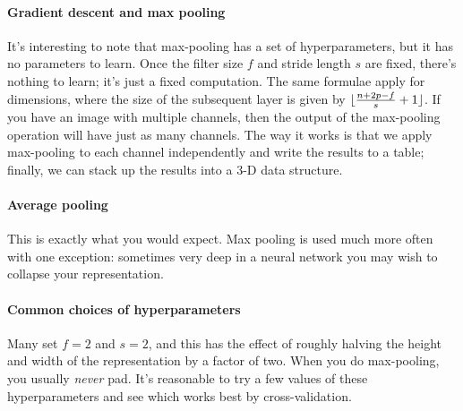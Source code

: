 \documentclass[12pt]{article}
\begin{document}
\paragraph{Gradient descent and max pooling} It's interesting to note that max-pooling has a set of hyperparameters, but it has no
parameters to learn. Once the filter size $f$ and stride length $s$ are fixed, there's nothing to learn; it's just a fixed 
computation. The same formulae apply for dimensions, where the size of the subsequent layer is given by $\lfloor\frac{n+2p - f}{s} + 1\rfloor$. If you have an image with multiple channels, then the output of the max-pooling operation will have just as many channels.
The way it works is that we apply max-pooling to each channel independently and write the results to a table; finally, we can stack up the results into a 3-D data structure.

\paragraph{Average pooling} This is exactly what you would expect. Max pooling is used much more often with one exception:
sometimes very deep in a neural network you may wish to collapse your representation.

\paragraph{Common choices of hyperparameters} Many set $f=2$ and $s=2$, and this has the effect of roughly halving the height and width of the representation by a factor of two. When you do max-pooling, you usually \emph{never} pad. It's reasonable to try a few values of these hyperparameters and see which works best by cross-validation.
\end{document}
